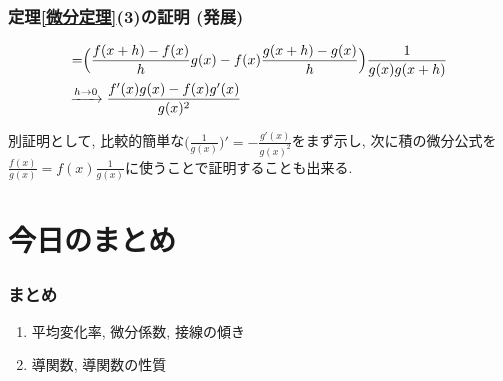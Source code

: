 \documentclass[dvipdfmx,cjk,10.2pt]{beamer}
\theoremstyle{definition}
\begin{document}


\begin{frame}
\frametitle{定理\ref{微分定理}(3)の証明 (発展)}


\begin{align*}
=& 
\Big(
\frac{f(x+h)-f(x)}{h} g(x)- f(x)\frac{g(x+h)-g(x)}{h}
\Big) \frac{1}{g(x)g(x+h)}
\\
& \hspace{-4mm} \xrightarrow{h \to 0} 
\frac{f'(x)g(x)-f(x)g'(x)}{g(x)^2}
\end{align*}

別証明として, 比較的簡単な$\Big(\frac{1}{g(x)}\Big)'=-\frac{g'(x)}{g(x)^2}$をまず示し, 
次に積の微分公式を$\frac{f(x)}{g(x)}=f(x) \frac{1}{g(x)}$に使うことで証明することも出来る. 

\end{frame}






\section{今日のまとめ}
\begin{frame}
\frametitle{まとめ}   


\begin{enumerate}
\item 平均変化率, 微分係数, 接線の傾き
\item 導関数, 導関数の性質
\end{enumerate} 


\end{frame}
\end{document}
